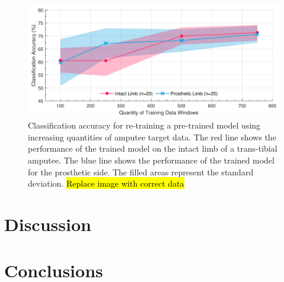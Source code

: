 \begin{figure}[hbt]
    \centering
    \includegraphics[width=\textwidth]{content/6-Amputee/ch6_amputee_pre_trained_model.pdf}
    \caption[Classification accuracy for re-training a pre-trained model using increasing quantities of amputee target data]{Classification accuracy for re-training a pre-trained model using increasing quantities of amputee target data. The red line shows the performance of the trained model on the intact limb of a trans-tibial amputee. The blue line shows the performance of the trained model for the prosthetic side. The filled areas represent the standard deviation. \hl{Replace image with correct data}}
    \label{fig:ch6-amputee-retrain-pre-trained}
\end{figure}

\section{Discussion}


\section{Conclusions}